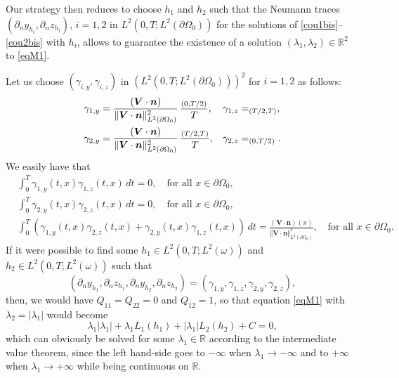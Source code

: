\documentclass[11pt]{article}
\makeatletter
\numberwithin{equation}{section}
\newcommand{\bn}{\boldsymbol{n}}
\newcommand{\bV}{\boldsymbol{V}}
\DeclareRobustCommand{\mathbbm}[1]{\csname jepbb@#1\endcsname}
\newcommand\R{{\mathbb R}}
\newcommand{\norm}[1]{\Vert#1\Vert}
\theoremstyle{definition}
\makeatother
\begin{document}
Our strategy then reduces to choose $h_1$ and $h_2$ such that the Neumann traces $(\partial_n y_{h_i},\partial_n z_{h_i})$, $i=1,2$ in $L^2(0,T; L^2(\partial\Omega_0))$ for the solutions of \eqref{cou1bis}--\eqref{cou2bis} with $h_i$, allows to guarantee the existence of a solution $(\lambda_1, \lambda_2) \in \R^2$ to \eqref{eqM1}.

Let us choose $(\gamma_{i,y}, \gamma_{i,z})$ in $(L^2(0,T; L^2(\partial \Omega_0)))^2$ for $i = 1, 2$ as follows:
\begin{align*}
\gamma_{1,y} &= \frac{(\bV \cdot \bn)}{\norm{\bV\cdot \bn}_{L^2(\partial\Omega_0)}^2}\, \frac{\mathbbm{1}_{(0,T/2)} }{T},
&\gamma_{1,z} &= \mathbbm{1}_{(T/2,T)},
\\
\gamma_{2, y} &= \frac{(\bV \cdot \bn)}{\norm{\bV\cdot \bn}_{L^2(\partial\Omega_0)}^2}\, \frac{\mathbbm{1}_{(T/2,T)} }{T},
&\gamma_{2, z} &= \mathbbm{1}_{(0,T/2)}.
\end{align*}
We easily have that
\begin{align*}
& \int_0^T \gamma_{1, y} (t, x) \gamma_{1,z}(t,x) \, dt = 0, \quad\text{for all } x \in \partial \Omega_0,
\\
& \int_0^T \gamma_{2, y} (t, x) \gamma_{2,z}(t,x) \, dt = 0, \quad\text{for all } x \in \partial \Omega_0,
\\
&
\int_0^T(\gamma_{1,y} (t,x) \gamma_{2,z} (t,x)+ \gamma_{2,y} (t,x)\gamma_{1,z} (t,x))\, dt = \frac{(\bV \cdot \bn)(x)}{\norm{\bV\cdot \bn}_{L^2(\partial\Omega_0)}^2},\quad\text{for all } x \in \partial \Omega_0.
\end{align*}
If it were possible to find some $h_1\in L^2(0,T; L^2(\omega))$ and $h_2\in L^2(0,T; L^2(\omega))$ such that
\begin{equation}
\label{exh}
(\partial_{n} y_{h_1},\partial_{n} z_{h_1},\partial_{n} y_{h_2},\partial_{n}z_{h_2})
=(\gamma_{1,y},\gamma_{1,z},\gamma_{2,y},\gamma_{2,z}),
\end{equation}
then, we would have $Q_{11}=Q_{22}=0$ and $Q_{12}=1$, so that equation \eqref{eqM1} with $\lambda_2 = |\lambda_1|$ would become
\begin{equation*}
\lambda_1|\lambda_1|+\lambda_1 L_1(h_1)+|\lambda_1| L_2(h_2)+C=0,
\end{equation*}
which can obviously be solved for some $\lambda_1 \in \R$ according to the intermediate value theorem, since the left hand-side goes to $-\infty$ when $\lambda_1 \to -\infty$ and to $+\infty$ when $\lambda_1 \to +\infty$ while being continuous on $\R$.
\end{document}
